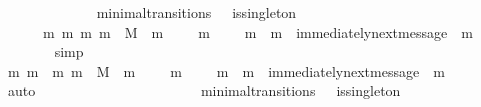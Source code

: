 \begin{isabellebody}
\ \ \ \ \ \ \isamarkupfalse%
\ {\isacartoucheopen}{\isasymforall}\ {\isasymsigma}\ {\isasymsigma}{\isacharprime}{\isachardot}\ {\isacharparenleft}{\isasymsigma}{\isacharcomma}\ {\isasymsigma}{\isacharprime}{\isacharparenright}\ {\isasymin}\ minimal{\isacharunderscore}transitions\ {\isasymand}\ {\isasymnot}\ is{\isacharunderscore}singleton\ {\isacharparenleft}{\isasymsigma}{\isacharprime}{\isacharminus}\ {\isasymsigma}{\isacharparenright}\isanewline
\ \ \ \ {\isasymlongrightarrow}\ {\isacharparenleft}{\isasymexists}\ m{}\ m{}{\isachardot}\ {\isacharbraceleft}m{}{\isacharcomma}\ m{}{\isacharbraceright}\ {\isasymsubseteq}\ M\ {\isasymand}\ m{}\ {\isasymin}\ {\isasymsigma}{\isacharprime}{\isacharminus}\ {\isasymsigma}\ {\isasymand}\ m{}\ {\isasymin}\ {\isasymsigma}{\isacharprime}{\isacharminus}\ {\isasymsigma}\ {\isasymand}\ m{}\ {\isasymnoteq}\ m{}\ {\isasymand}\ immediately{\isacharunderscore}next{\isacharunderscore}message\ {\isacharparenleft}{\isasymsigma}{\isacharcomma}\ m{}{\isacharparenright}{\isacharparenright}{\isacartoucheclose}\isanewline
\ \ \ \ \ \ \isamarkupfalse%
\ simp\isanewline
\ \ \ \ \isamarkupfalse%
\ \isamarkupfalse%
\ m{}\ m{}\ \ {\isachardoublequoteopen}{\isacharbraceleft}m{}{\isacharcomma}\ m{}{\isacharbraceright}\ {\isasymsubseteq}\ M\ {\isasymand}\ m{}\ {\isasymin}\ {\isasymsigma}{\isacharprime}{\isacharminus}\ {\isasymsigma}\ {\isasymand}\ m{}\ {\isasymin}\ {\isasymsigma}{\isacharprime}{\isacharminus}\ {\isasymsigma}\ {\isasymand}\ m{}\ {\isasymnoteq}\ m{}\ {\isasymand}\ immediately{\isacharunderscore}next{\isacharunderscore}message\ {\isacharparenleft}{\isasymsigma}{\isacharcomma}\ m{}{\isacharparenright}{\isachardoublequoteclose}\isanewline
\ \ \ \ \ \ \isamarkupfalse%
\ auto\isanewline
\ \ \ \ \isamarkupfalse%
\ {\isachardoublequoteopen}{\isasymsigma}\ {\isasymin}\ {\isasymSigma}\ {\isasymand}\ {\isasymsigma}{\isacharprime}\ {\isasymin}\ {\isasymSigma}{\isachardoublequoteclose}\isanewline
\ \ \ \ \ \ \isamarkupfalse%
\ {\isacartoucheopen}{\isacharparenleft}{\isasymsigma}{\isacharcomma}\ {\isasymsigma}{\isacharprime}{\isacharparenright}\ {\isasymin}\ minimal{\isacharunderscore}transitions\ {\isasymand}\ {\isasymnot}\ is{\isacharunderscore}singleton\ {\isacharparenleft}{\isasymsigma}{\isacharprime}\ {\isacharminus}\ {\isasymsigma}{\isacharparenright}{\isacartoucheclose}\isanewline

\end{isabellebody}
